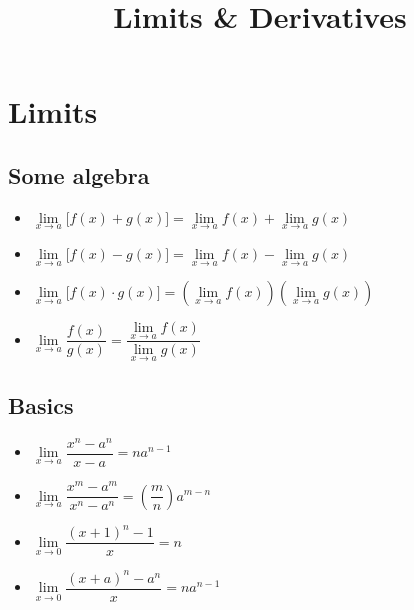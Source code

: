 \documentclass{article}
\title{Limits \& Derivatives}
\begin{document}
\maketitle
\section{Limits}
\subsection{Some algebra}
\begin{itemize}
  \item $\lim\limits_{x \to a}\bigl[f(x) + g(x)\bigr] =
  \lim\limits_{x \to a}f(x) + \lim\limits_{x \to a}g(x)$
  \item $\lim\limits_{x \to a}\bigl[f(x) - g(x)\bigr] =
  \lim\limits_{x \to a}f(x) - \lim\limits_{x \to a}g(x)$
  \item $\lim\limits_{x \to a}\bigl[f(x) \cdot g(x)\bigr] =
  \left(\lim\limits_{x \to a}f(x)\right)\left(\lim\limits_{x \to a}g(x)\right)$
  \item $\lim\limits_{x \to a}\dfrac{f(x)}{g(x)} =
  \dfrac{\lim\limits_{x \to a}f(x)}{\lim\limits_{x \to a}g(x)}$
\end{itemize}

\maketitle
\subsection{Basics}
\begin{itemize} 
  \item $\lim\limits_{x \to a}\dfrac{x^n - a^n}{x - a} = na^{n-1}$
  \item $\lim\limits_{x \to a}\dfrac{x^m - a^m}{x^n - a^n} = \left(\dfrac{m}{n}\right)a^{m-n}$
  \item $\lim\limits_{x \to 0}\dfrac{{(x+1)}^{n}-1}{x} = n$
  \item $\lim\limits_{x \to 0}\dfrac{{(x+a)}^{n} - a^n}{x} = na^{n-1}$
\end{itemize} 

\maketitle
\end{document}
